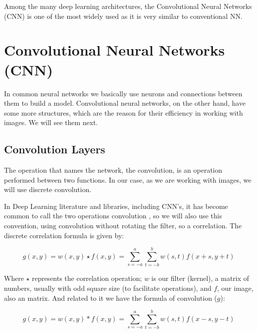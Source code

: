 Among the many deep learning architectures, the Convolutional Neural Networks (CNN) is one of the most widely used as it is very similar to conventional NN.

\section{Convolutional Neural Networks (CNN)}

In common neural networks we basically use neurons and connections between them to build a model. Convolutional neural networks, on the other hand, have some more structures, which are the reason for their efficiency in working with images. We will see them next.


\subsection{Convolution Layers}

The operation that names the network, the convolution, is an operation performed between two functions. In our case, as we are working with images, we will use discrete convolution.

In Deep Learning  literature and libraries, including CNN's, it has become common to call the two operations convolution \cite{goodfellow2016}, so we will also use this convention, using convolution without rotating the filter, so a correlation.
The discrete correlation formula is given by:

\begin{equation}
g(x,y)=w(x,y)\star f(x,y)=\sum_{s=-a}^a\sum_{t=-b}^bw(s,t)f(x+s,y+t)
\end{equation}

Where $\star$ represents the correlation operation; $w$ is our filter (kernel), a matrix of numbers, usually with odd square size (to facilitate operations), and $f$, our image, also an matrix. And related to it we have the formula of convolution ($g$):

\begin{equation}
g(x,y)=w(x,y)\ast f(x,y)=\sum_{s=-a}^a\sum_{t=-b}^bw(s,t)f(x-s,y-t)
\end{equation}

